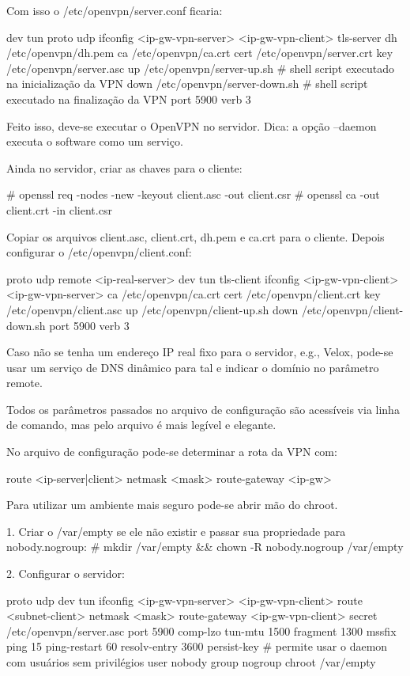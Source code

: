 Com isso o /etc/openvpn/server.conf ficaria:

dev tun
proto udp
ifconfig <ip-gw-vpn-server> <ip-gw-vpn-client>
tls-server
dh /etc/openvpn/dh.pem
ca /etc/openvpn/ca.crt
cert /etc/openvpn/server.crt
key /etc/openvpn/server.asc
up /etc/openvpn/server-up.sh  # shell script executado na inicialização da VPN
down /etc/openvpn/server-down.sh  # shell script executado na finalização da VPN
port 5900
verb 3

Feito isso, deve-se executar o OpenVPN no servidor. Dica: a opção --daemon executa o software como um serviço.

Ainda no servidor, criar as chaves para o cliente:

# openssl req -nodes -new -keyout client.asc -out client.csr
# openssl ca -out client.crt -in client.csr

Copiar os arquivos client.asc, client.crt, dh.pem e ca.crt para o cliente. Depois configurar o /etc/openvpn/client.conf:

proto udp
remote <ip-real-server>
dev tun
tls-client
ifconfig <ip-gw-vpn-client> <ip-gw-vpn-server>
ca /etc/openvpn/ca.crt
cert /etc/openvpn/client.crt
key /etc/openvpn/client.asc
up /etc/openvpn/client-up.sh
down /etc/openvpn/client-down.sh
port 5900
verb 3

Caso não se tenha um endereço IP real fixo para o servidor, e.g., Velox, pode-se usar um serviço de DNS dinâmico para tal e indicar o domínio no parâmetro remote.

Todos os parâmetros passados no arquivo de configuração são acessíveis via linha de comando, mas pelo arquivo é mais legível e elegante.

No arquivo de configuração pode-se determinar a rota da VPN com:

route <ip-server|client> netmask <mask>
route-gateway <ip-gw>

Para utilizar um ambiente mais seguro pode-se abrir mão do chroot.

1. Criar o /var/empty se ele não existir e passar sua propriedade para nobody.nogroup:
# mkdir /var/empty && chown -R nobody.nogroup /var/empty

2. Configurar o servidor:

proto udp
dev tun
ifconfig <ip-gw-vpn-server> <ip-gw-vpn-client>
route <subnet-client> netmask <mask>
route-gateway <ip-gw-vpn-client>
secret /etc/openvpn/server.asc
port 5900
comp-lzo
tun-mtu 1500
fragment 1300
mssfix
ping 15
ping-restart 60
resolv-entry 3600
persist-key  # permite usar o daemon com usuários sem privilégios
user nobody
group nogroup
chroot /var/empty
